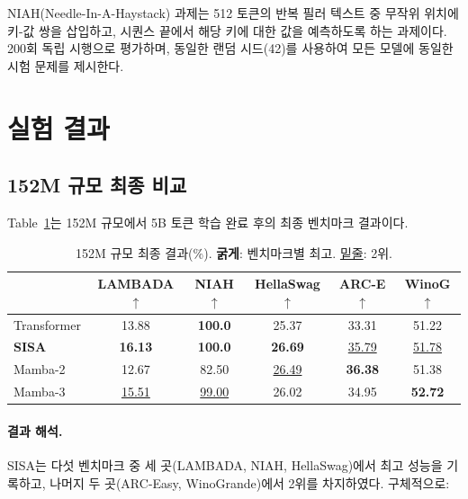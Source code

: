 \documentclass[11pt]{article}
\begin{document}
NIAH(Needle-In-A-Haystack) 과제는 512 토큰의 반복 필러 텍스트 중 무작위 위치에 키-값 쌍을 삽입하고, 시퀀스 끝에서 해당 키에 대한 값을 예측하도록 하는 과제이다. 200회 독립 시행으로 평가하며, 동일한 랜덤 시드(42)를 사용하여 모든 모델에 동일한 시험 문제를 제시한다.

\section{실험 결과}

\subsection{152M 규모 최종 비교}

Table~\ref{tab:main_results}는 152M 규모에서 5B 토큰 학습 완료 후의 최종 벤치마크 결과이다.

\begin{table}[h]
\centering
\caption{152M 규모 최종 결과(\%). \textbf{굵게}: 벤치마크별 최고. \underline{밑줄}: 2위.}
\label{tab:main_results}
\begin{tabular}{lccccc}
\toprule
& \textbf{LAMBADA}$\uparrow$ & \textbf{NIAH}$\uparrow$ & \textbf{HellaSwag}$\uparrow$ & \textbf{ARC-E}$\uparrow$ & \textbf{WinoG}$\uparrow$ \\
\midrule
Transformer & 13.88 & \textbf{100.0} & 25.37 & 33.31 & 51.22 \\
\textbf{SISA} & \textbf{16.13} & \textbf{100.0} & \textbf{26.69} & \underline{35.79} & \underline{51.78} \\
Mamba-2 & 12.67 & 82.50 & \underline{26.49} & \textbf{36.38} & 51.38 \\
Mamba-3 & \underline{15.51} & \underline{99.00} & 26.02 & 34.95 & \textbf{52.72} \\
\bottomrule
\end{tabular}
\end{table}

\paragraph{결과 해석.} SISA는 다섯 벤치마크 중 세 곳(LAMBADA, NIAH, HellaSwag)에서 최고 성능을 기록하고, 나머지 두 곳(ARC-Easy, WinoGrande)에서 2위를 차지하였다. 구체적으로:
\end{document}
